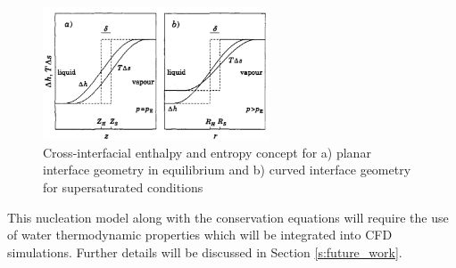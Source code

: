 \documentclass[12pt]{article}
\begin{document}
\begin{figure}[H]
    \centering
    \includegraphics[width=0.6\textwidth]{Figures/Granasy_plot.png}
    \caption{Cross-interfacial enthalpy and entropy concept for a) planar interface geometry in equilibrium and b) curved interface geometry for supersaturated conditions \cite{granasy1993diffuse}}
    \label{f:granasy}
\end{figure}
This nucleation model along with the conservation equations will require the use of water thermodynamic properties which will be integrated into CFD simulations. Further details will be discussed in Section \ref{s:future_work}.
\end{document}
